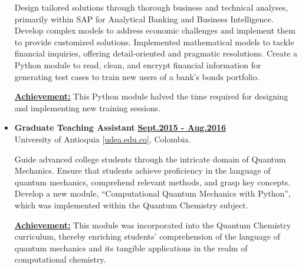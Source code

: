 \begin{itemize}[leftmargin=5mm]

          Design tailored solutions through thorough business and technical analyses, primarily within SAP for Analytical Banking and Business Intelligence.
          Develop complex models to address economic challenges and implement them to provide customized solutions.
          Implemented mathematical models to tackle financial inquiries, offering detail-oriented and pragmatic resolutions.
          Create a Python module to read, clean, and encrypt financial information for generating test cases to train new users of a bank's bonds portfolio.

          \textbf{\href{.}{\underline{Achievement:}}}
          This Python module halved the time required for designing and implementing new training sessions.

    \item \textbf{\large Graduate Teaching Assistant}\hfill
          \href{.}{\bf Sept.2015 - Aug.2016}\\
          University of Antioquia [\href{www.udea.edu.co}{udea.edu.co}],
          Colombia.


          Guide advanced college students through the intricate domain of Quantum Mechanics.
          Ensure that students achieve proficiency in the language of quantum mechanics, comprehend relevant methods, and grasp key concepts.
          Develop a new module, ``Computational Quantum Mechanics with Python'', which was implemented within the Quantum Chemistry subject.

          \textbf{\href{.}{\underline{Achievement:}}}
          This module was incorporated into the Quantum Chemistry curriculum, thereby enriching students' comprehension of the language of quantum mechanics and its tangible applications in the realm of computational chemistry.

\end{itemize}
